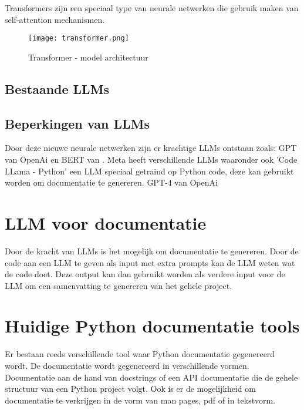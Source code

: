 Transformers zijn een speciaal type van neurale netwerken die gebruik maken van self-attention mechanismen.

\begin{figure}[h]
  \centering
  \texttt{[image: transformer.png]}
  \caption{Transformer - model architectuur \autocite{VaswaniEtAl2017}}
  \label{fig:transformer-model}
\end{figure}


\subsection{Bestaande LLMs}
\label{sec:bestaande-llms}

\subsection{Beperkingen van LLMs}
\label{sec:beperkingen-van-llms}


Door deze nieuwe neurale netwerken zijn er krachtige LLMs ontstaan zoals: GPT van OpenAi  \autocite{RandfordEtAL2018} en BERT van \textcite{DevlinEtAl2019}.
Meta heeft verschillende LLMs waaronder ook 'Code LLama - Python' een LLM speciaal getraind op Python code, deze kan gebruikt worden om documentatie te genereren. \autocite{Roziere2024}
GPT-4 van OpenAi 



\section{LLM voor documentatie}
\label{sec:llm-voor-documentatie}

Door de kracht van LLMs is het mogelijk om documentatie te genereren. Door de code aan een LLM te geven als input met extra prompts kan de LLM weten wat de code doet.
Deze output kan dan gebruikt worden als verdere input voor de LLM om een samenvatting te genereren van het gehele project.

\section*{{Huidige Python documentatie tools}}
\label{sec:huidige-tools}

Er bestaan reeds verschillende tool waar Python documentatie gegenereerd wordt. De documentatie wordt gegenereerd in verschillende vormen. 
Documentatie aan de hand van docstrings of een API documentatie die de gehele structuur van een Python project volgt. 
Ook is er de mogelijkheid om documentatie te verkrijgen in de vorm van man pages, pdf of in tekstvorm.

